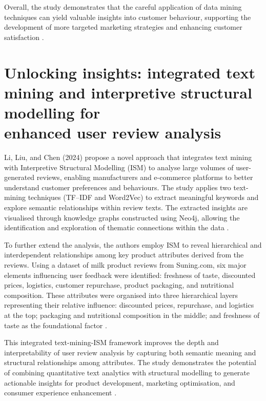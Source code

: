 \documentclass[a4paper, 12pt, twoside]{report}  %
\begin{document}
\indent Overall, the study demonstrates that the careful application of data mining techniques can yield valuable insights into customer behaviour, supporting the development of more targeted marketing strategies and enhancing customer satisfaction \cite{datamining}.

\section{\texorpdfstring{
    Unlocking insights: integrated text mining and interpretive structural modelling for \\ enhanced user review analysis
}{
    Unlocking insights: integrated text mining and interpretive structural modelling for enhanced user review analysis
}}

\indent Li, Liu, and Chen (2024) propose a novel approach that integrates text mining with Interpretive Structural Modelling (ISM) to analyse large volumes of user-generated reviews, enabling manufacturers and e-commerce platforms to better understand customer preferences and behaviours. The study applies two text-mining techniques (TF–IDF and Word2Vec) to extract meaningful keywords and explore semantic relationships within review texts. The extracted insights are visualised through knowledge graphs constructed using Neo4j, allowing the identification and exploration of thematic connections within the data \cite{unlockinginsights}.

\indent To further extend the analysis, the authors employ ISM to reveal hierarchical and interdependent relationships among key product attributes derived from the reviews. Using a dataset of milk product reviews from Suning.com, six major elements influencing user feedback were identified: freshness of taste, discounted prices, logistics, customer repurchase, product packaging, and nutritional composition. These attributes were organised into three hierarchical layers representing their relative influence: discounted prices, repurchase, and logistics at the top; packaging and nutritional composition in the middle; and freshness of taste as the foundational factor \cite{unlockinginsights}.

\indent This integrated text-mining-ISM framework improves the depth and interpretability of user review analysis by capturing both semantic meaning and structural relationships among attributes. The study demonstrates the potential of combining quantitative text analytics with structural modelling to generate actionable insights for product development, marketing optimisation, and consumer experience enhancement \cite{unlockinginsights}.
\end{document}
